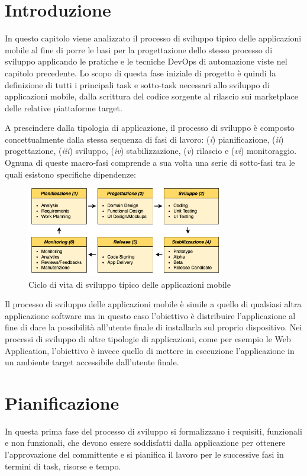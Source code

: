 
\section{Introduzione}
In questo capitolo viene analizzato il processo di sviluppo tipico delle applicazioni mobile al fine di porre le basi per la progettazione dello stesso processo di sviluppo applicando le pratiche e le tecniche DevOps di automazione viste nel capitolo precedente. Lo scopo di questa fase iniziale di progetto è quindi la definizione di tutti i principali task e sotto-task necessari allo sviluppo di applicazioni mobile, dalla scrittura del codice sorgente al rilascio sui marketplace delle relative piattaforme target. 

A prescindere dalla tipologia di applicazione, il processo di sviluppo è composto concettualmente dalla stessa sequenza di fasi di lavoro: (\textit{i}) pianificazione, (\textit{ii}) progettazione, (\textit{iii}) sviluppo, (\textit{iv}) stabilizzazione, (\textit{v}) rilascio e (\textit{vi}) monitoraggio. Ognuna di queste macro-fasi comprende a sua volta una serie di sotto-fasi tra le quali esistono specifiche dipendenze:

\begin{figure}[H]
    \centering
    \includegraphics[width=0.76\textwidth]{img/sdlc.png}
    \caption{Ciclo di vita di sviluppo tipico delle applicazioni mobile}
    \label{sdlc-app-mobile-fig}
\end{figure}

Il processo di sviluppo delle applicazioni mobile è simile a quello di qualsiasi altra applicazione software ma in questo caso l'obiettivo è distribuire l'applicazione al fine di dare la possibilità all'utente finale di installarla sul proprio dispositivo. Nei processi di sviluppo di altre tipologie di applicazioni, come per esempio le Web Application, l'obiettivo è invece quello di mettere in esecuzione l'applicazione in un ambiente target accessibile dall'utente finale.

\section{Pianificazione}
In questa prima fase del processo di sviluppo si formalizzano i requisiti, funzionali e non funzionali, che devono essere soddisfatti dalla applicazione per ottenere l'approvazione del committente e si pianifica il lavoro per le successive fasi in termini di task, risorse e tempo.

